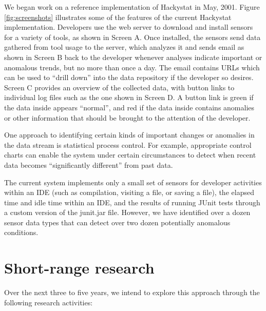 We began work on a reference implementation of Hackystat in May, 2001.
Figure \ref{fig:screenshots} illustrates some of the features of the
current Hackystat implementation.
Developers use the web server to download and install sensors for a variety
of tools, as shown in Screen A.  Once installed, the sensors send data
gathered from tool usage to the server, which analyzes it and sends email
as shown in Screen B back to the developer whenever analyses indicate
important or anomalous trends, but no more than once a day.  The email
contains URLs which can be used to ``drill down'' into the data repository
if the developer so desires. Screen C provides an overview of the collected
data, with button links to individual log files such as the one shown in
Screen D.  A button link is green if the data inside appears ``normal'',
and red if the data inside contains anomalies or other information that
should be brought to the attention of the developer. 

One approach to identifying certain kinds of important changes or anomalies 
in the data stream is statistical process control.  For example,
appropriate control charts can enable the system under certain
circumstances to detect when recent data becomes ``significantly
different'' from past data.  

The current system implements only a small set of sensors for developer
activities within an IDE (such as compilation, visiting a file, or saving a
file), the elapsed time and idle time within an IDE, and the results of
running JUnit tests through a custom version of the junit.jar file.
However, we have identified over a dozen sensor data types that can detect
over two dozen potentially anomalous conditions.


\section*{Short-range research}

Over the next three to five years, we intend to explore this approach
through the following research activities:


